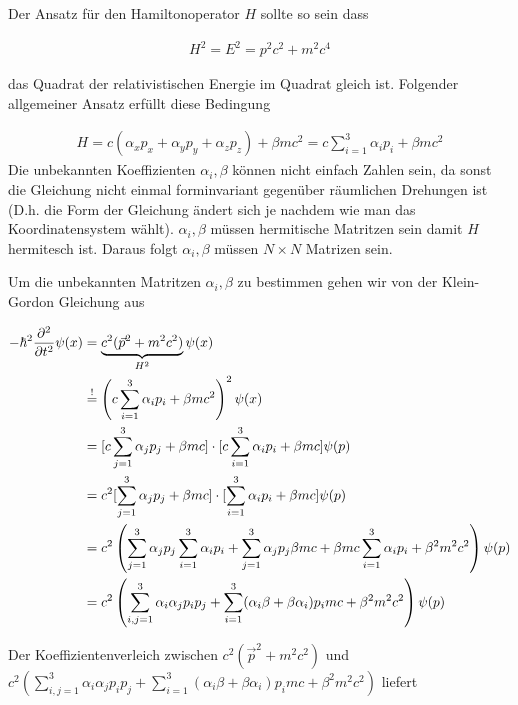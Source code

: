 Der Ansatz für den Hamiltonoperator \(H\) sollte so sein dass

\begin{align}
  \label{eq:4}
  H^2 = E^2 = p^2c^2+ m^2c^4
\end{align}

das Quadrat der relativistischen Energie im Quadrat gleich ist. Folgender allgemeiner Ansatz erfüllt diese Bedingung

\begin{align}
  \label{eq:5}
  H = c (\alpha_x p_x + \alpha_y p_y + \alpha_z p_z) + \beta mc^2 = c\sum_{i=1}^3\alpha_i p_i   + \beta mc^2
\end{align}
Die unbekannten Koeffizienten \(\alpha_i,\beta\) können nicht einfach Zahlen sein, da sonst die Gleichung nicht einmal forminvariant gegenüber räumlichen Drehungen ist (D.h. die Form der Gleichung ändert sich je nachdem wie man das Koordinatensystem wählt). \(\alpha_i,\beta\) müssen hermitische Matritzen sein damit \(H\) hermitesch ist. Daraus folgt  \(\alpha_i,\beta\) müssen \(N\times N\) Matrizen sein.

Um die unbekannten Matritzen  \(\alpha_i,\beta\) zu bestimmen gehen wir von der Klein-Gordon Gleichung aus

\begin{align}
  \label{eq:6}
  -\hbar^2 \pdiff^2_t \psi(x) &= \underbrace{c^2(\vec p^2 + m^2c^2)}_{H^2}\psi(x)\\
 &\stackrel{!}= \left(  c\sum_{i=1}^3\alpha_i p_i   + \beta mc^2 \right)^2\psi(x)\\
&=[c \sum_{j=1}^3 \alpha_jp_j+\beta mc] \cdot [c \sum_{i=1}^3 \alpha_ip_i+\beta mc]\psi(p) \\
&=c^2 [ \sum_{j=1}^3 \alpha_jp_j+\beta mc] \cdot [ \sum_{i=1}^3 \alpha_ip_i+\beta mc]\psi(p) \\
&=c^2 \left( \sum_{j=1}^3 \alpha_jp_j\sum_{i=1}^3 \alpha_ip_i  +   \sum_{j=1}^3 \alpha_jp_j \beta mc  + \beta mc \sum_{i=1}^3 \alpha_ip_i+ \beta^2 m^2c^2\right)\psi(p) \\
&= c^2\left(\sum_{i,j=1}^3\alpha_i\alpha_j p_ip_j+\sum_{i=1}^3(\alpha_i\beta+\beta\alpha_i)p_i mc +  \beta^2m^2c^2\right)\psi(p)
\end{align}

Der Koeffizientenverleich zwischen \(c^2(\vec p^2 + m^2c^2)\) und \( c^2\left(\sum_{i,j=1}^3\alpha_i\alpha_j p_ip_j+\sum_{i=1}^3(\alpha_i\beta+\beta\alpha_i)p_i mc +  \beta^2m^2c^2\right)\) liefert


